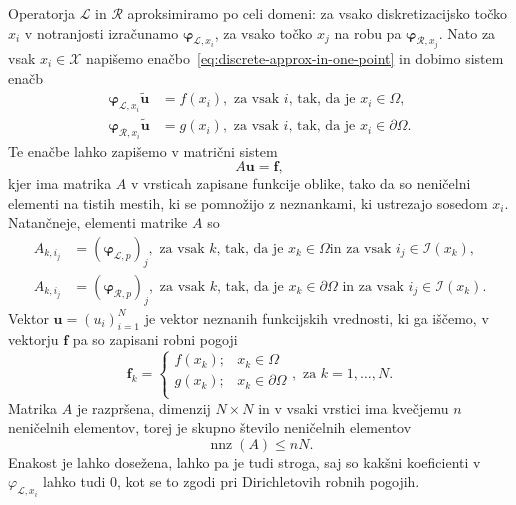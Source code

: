 \documentclass[12pt,a4paper,twoside]{article}
\theoremstyle{definition} %
\theoremstyle{plain} %
\numberwithin{equation}{section}
\newcommand{\Rc}{\mathcal{R}}
\newcommand{\I}{\mathcal{I}}
\renewcommand{\L}{\mathcal{L}}
\newcommand{\X}{\mathcal{X}}
\renewcommand{\b}{\boldsymbol}
\renewcommand{\phi}{\varphi}
\DeclareMathOperator{\nnz}{nnz}
\begin{document}
Operatorja $\L$ in $\Rc$ aproksimiramo po celi domeni: za vsako diskretizacijsko točko $x_i$
v notranjosti izračunamo $\b\phi_{\L, x_i}$, za vsako točko $x_j$ na robu pa $\b\phi_{\Rc, x_j}$.
Nato za vsak $x_i \in \X$ napišemo enačbo~\eqref{eq:discrete-approx-in-one-point} in dobimo
sistem enačb
\begin{align}
  \b\phi_{\L, x_i} \b{\tilde{u}} &= f(x_i), \text{ za vsak $i$, tak, da je $x_i \in \Omega$,} \\
  \b\phi_{\Rc, x_i} \b{\tilde{u}} &= g(x_i), \text{ za vsak $i$, tak, da je $x_i \in \partial\Omega$.}
\end{align}
Te enačbe lahko zapišemo v matrični sistem
\begin{equation}
  A\b{u} = \b{f},
  \label{eq:discretized-system}
\end{equation}
kjer ima matrika $A$ v vrsticah zapisane funkcije oblike, tako da so neničelni elementi na tistih
mestih, ki se pomnožijo z neznankami, ki ustrezajo sosedom $x_i$. Natančneje, elementi matrike $A$
so
\begin{align}
  A_{k, i_j} &= (\b\phi_{\L, p})_j, \text{ za vsak $k$, tak, da je $x_k \in \Omega$
  in za vsak $i_j \in \I(x_k)$,} \\
  A_{k, i_j} &= (\b\phi_{\Rc, p})_j, \text{ za vsak $k$, tak, da je $x_k \in
  \partial\Omega$ in za vsak $i_j \in \I(x_k)$.}
\end{align}
Vektor $\b{u} = (u_i)_{i=1}^N$ je vektor neznanih funkcijskih vrednosti, ki ga
iščemo, v vektorju $\b{f}$ pa so zapisani robni pogoji
\begin{equation}
  \b f_k = \begin{cases}
    f(x_k); & x_k \in \Omega \\
    g(x_k); & x_k \in \partial\Omega \\
  \end{cases}, \text{ za $k = 1, \ldots, N$}.
\end{equation}
Matrika $A$ je razpršena, dimenzij $N\times N$ in v vsaki vrstici ima kvečjemu $n$ neničelnih
elementov, torej je skupno število neničelnih elementov
\begin{equation}
   \nnz(A) \leq nN.
\end{equation}
Enakost je lahko dosežena, lahko pa je tudi stroga, saj so kakšni koeficienti v $\phi_{\L, x_i}$ lahko
tudi 0, kot se to zgodi pri Dirichletovih robnih pogojih.
\end{document}
